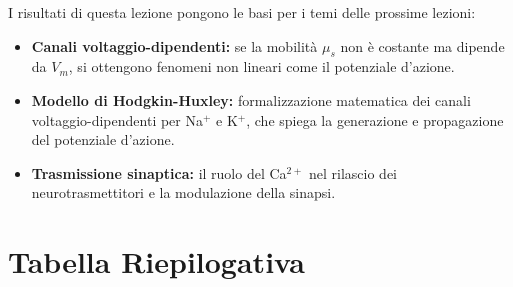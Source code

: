 I risultati di questa lezione pongono le basi per i temi delle prossime lezioni:

\begin{itemize}
    \item \textbf{Canali voltaggio-dipendenti:} se la mobilità $\mu_s$ non è costante ma dipende da $V_m$, si ottengono fenomeni non lineari come il potenziale d'azione.
    \item \textbf{Modello di Hodgkin-Huxley:} formalizzazione matematica dei canali voltaggio-dipendenti per Na$^+$ e K$^+$, che spiega la generazione e propagazione del potenziale d'azione.
    \item \textbf{Trasmissione sinaptica:} il ruolo del Ca$^{2+}$ nel rilascio dei neurotrasmettitori e la modulazione della sinapsi.
\end{itemize}


\section*{Tabella Riepilogativa}

